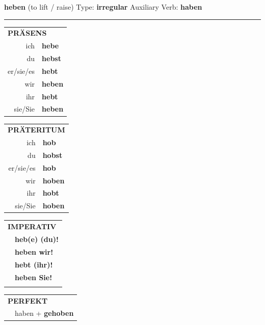 \documentclass[10pt,a4paper]{revtex4-2}
\begin{document}
\begin{verbbox}
    {\Large \bf heben} (to lift / raise) \hfill Type: \textbf{irregular} \hfill Auxiliary Verb: \textbf{haben} 
    
     \vspace{5pt}

    \hrule
    
    \vspace{5pt}

  \begin{tabular}{rl}
     \multicolumn{2}{l}{\textbf{PRÄSENS} }\\
    ich & \textbf{hebe}\\
    du & \textbf{hebst}\\
    er/sie/es & \textbf{hebt}\\
    wir & \textbf{heben}\\
    ihr & \textbf{hebt}\\
    sie/Sie & \textbf{heben}\\
  \end{tabular}
  \hfill
     \begin{tabular}{rl}
    \multicolumn{2}{l}{\textbf{PRÄTERITUM} }\\
    ich & \textbf{hob}\\
    du & \textbf{hobst}\\
    er/sie/es & \textbf{hob}\\
    wir & \textbf{hoben}\\
    ihr & \textbf{hobt}\\
    sie/Sie & \textbf{hoben}\\
  \end{tabular}
  \hfill
  \begin{tabular}{rl}
     \multicolumn{2}{l}{\textbf{IMPERATIV} }\\
   & \textbf{heb(e) (du)!}\\
   & \textbf{heben wir!}\\
   & \textbf{hebt (ihr)!}\\
   & \textbf{heben Sie!}\\
   & \vspace{10pt}
  \end{tabular}

    \vspace{10pt}

 \begin{tabular}{rl}
     \multicolumn{2}{l}{\textbf{PERFEKT}}\\
   & haben + \textbf{gehoben}\\
  \end{tabular}
\hfill
   \begin{tabular}{rl}
   

\end{tabular}
\end{verbbox}
\end{document}
